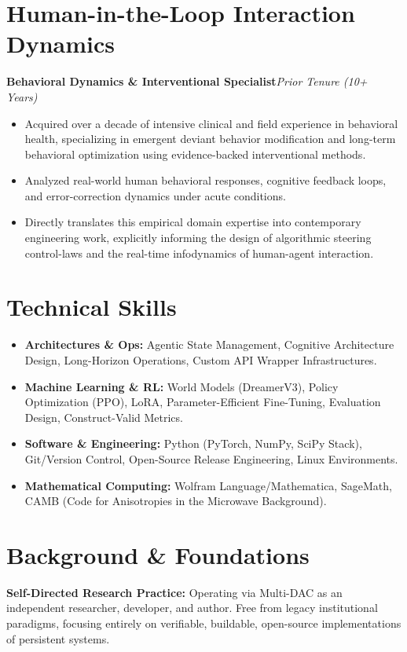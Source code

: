 \documentclass[10pt]{article}
\newcommand{\entry}[2]{\textbf{#1}\hfill\textit{#2}\par\vspace{1pt}}
\begin{document}
\section{Human-in-the-Loop Interaction Dynamics}
\entry{Behavioral Dynamics \& Interventional Specialist}{Prior Tenure (10+ Years)}
\begin{itemize}
\item Acquired over a decade of intensive clinical and field experience in behavioral health, specializing in emergent deviant behavior modification and long-term behavioral optimization using evidence-backed interventional methods.
\item Analyzed real-world human behavioral responses, cognitive feedback loops, and error-correction dynamics under acute conditions.
\item Directly translates this empirical domain expertise into contemporary engineering work, explicitly informing the design of algorithmic steering control-laws and the real-time infodynamics of human-agent interaction.
\end{itemize}

\section{Technical Skills}
\begin{itemize}
\item \textbf{Architectures \& Ops:} Agentic State Management, Cognitive Architecture Design, Long-Horizon Operations, Custom API Wrapper Infrastructures.
\item \textbf{Machine Learning \& RL:} World Models (DreamerV3), Policy Optimization (PPO), LoRA, Parameter-Efficient Fine-Tuning, Evaluation Design, Construct-Valid Metrics.
\item \textbf{Software \& Engineering:} Python (PyTorch, NumPy, SciPy Stack), Git/Version Control, Open-Source Release Engineering, Linux Environments.
\item \textbf{Mathematical Computing:} Wolfram Language/Mathematica, SageMath, CAMB (Code for Anisotropies in the Microwave Background).
\end{itemize}

\section{Background \& Foundations}
\textbf{Self-Directed Research Practice:} Operating via Multi-DAC as an independent researcher, developer, and author. Free from legacy institutional paradigms, focusing entirely on verifiable, buildable, open-source implementations of persistent systems.
\end{document}
